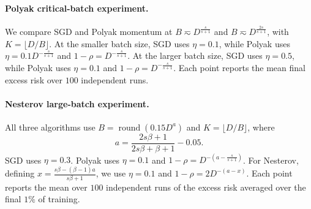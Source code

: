 \paragraph{Polyak critical-batch experiment.}
We compare SGD and Polyak momentum at \(B\eqsim D^{\frac{s}{s+1}}\) and \(B\eqsim D^{\frac{2s}{s+1}}\), with \(K=\lfloor D/B\rfloor\). At the smaller batch size, SGD uses \(\eta=0.1\), while Polyak uses \(\eta=0.1D^{-\frac{s}{s+1}}\) and \(1-\rho=D^{-\frac{s}{s+1}}\). At the larger batch size, SGD uses \(\eta=0.5\), while Polyak uses \(\eta=0.1\) and \(1-\rho=D^{-\frac{s}{s+1}}\). Each point reports the mean final excess risk over \(100\) independent runs.

\paragraph{Nesterov large-batch experiment.}
All three algorithms use \(B=\operatorname{round}(0.15D^a)\) and \(K=\lfloor D/B\rfloor\), where
\[
a=\frac{2s\beta+1}{2s\beta+\beta+1}-0.05.
\]
SGD uses \(\eta=0.3\). Polyak uses \(\eta=0.1\) and \(1-\rho=D^{-(a-\frac{s}{s+1})}\). For Nesterov, defining \(x=\frac{s\beta-(\beta-1)a}{s\beta+1}\), we use \(\eta=0.1\) and \(1-\rho=2D^{-(a-x)}\). Each point reports the mean over \(100\) independent runs of the excess risk averaged over the final \(1\%\) of training. 
